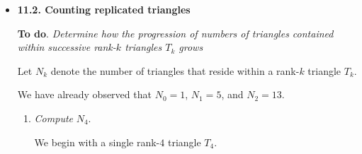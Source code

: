 \begin{itemize}
\item
{\bf 11.2. Counting replicated triangles}
\smallskip

{\bf To do}.  {\em Determine how the progression of numbers of triangles contained within successive rank-$k$ triangles $T_k$ grows}

\smallskip

Let $N_k$ denote the number of triangles that reside within a rank-$k$ triangle $T_k$.

We have already observed that $N_0 =1$, $N_1 = 5$, and $N_2 = 13$.
  \begin{enumerate}
  \item
{\em Compute} $N_4$.

\smallskip

We begin with a single rank-$4$ triangle $T_4$.

\smallskip


\end{enumerate}
\end{itemize}
